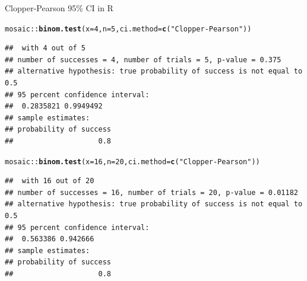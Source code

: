 \documentclass[10pt,handout]{beamer}\usepackage[]{graphicx}\usepackage[]{color}
\makeatletter
\newcommand{\hlnum}[1]{\textcolor[rgb]{0.686,0.059,0.569}{#1}}%
\newcommand{\hlstr}[1]{\textcolor[rgb]{0.192,0.494,0.8}{#1}}%
\newcommand{\hlopt}[1]{\textcolor[rgb]{0,0,0}{#1}}%
\newcommand{\hlstd}[1]{\textcolor[rgb]{0.345,0.345,0.345}{#1}}%
\newcommand{\hlkwc}[1]{\textcolor[rgb]{0.333,0.667,0.333}{#1}}%
\newcommand{\hlkwd}[1]{\textcolor[rgb]{0.737,0.353,0.396}{\textbf{#1}}}%
\newenvironment{kframe}{%
 \def\at@end@of@kframe{}%
 \ifinner\ifhmode%
  \def\at@end@of@kframe{\end{minipage}}%
  \begin{minipage}{\columnwidth}%
 \fi\fi%
 \def\FrameCommand##1{\hskip\@totalleftmargin \hskip-\fboxsep
 \colorbox{shadecolor}{##1}\hskip-\fboxsep
     \hskip-\linewidth \hskip-\@totalleftmargin \hskip\columnwidth}%
 \MakeFramed {\advance\hsize-\width
   \@totalleftmargin\z@ \linewidth\hsize
   \@setminipage}}%
 {\par\unskip\endMakeFramed%
 \at@end@of@kframe}
\newenvironment{knitrout}{}{} %
\makeatother
\begin{document}
\begin{frame}[fragile]{Clopper-Pearson 95\% CI in R}
\begin{knitrout}\tiny
{}\color{fgcolor}\begin{kframe}
\begin{alltt}
\hlstd{mosaic}\hlopt{::}\hlkwd{binom.test}\hlstd{(}\hlkwc{x}\hlstd{=}\hlnum{4}\hlstd{,} \hlkwc{n}\hlstd{=}\hlnum{5}\hlstd{,} \hlkwc{ci.method}\hlstd{=}\hlkwd{c}\hlstd{(}\hlstr{"Clopper-Pearson"}\hlstd{))}
\end{alltt}
\begin{verbatim}
##  with 4 out of 5 
## number of successes = 4, number of trials = 5, p-value = 0.375
## alternative hypothesis: true probability of success is not equal to 0.5 
## 95 percent confidence interval:
##  0.2835821 0.9949492 
## sample estimates:
## probability of success 
##                    0.8
\end{verbatim}
\begin{alltt}
\hlstd{mosaic}\hlopt{::}\hlkwd{binom.test}\hlstd{(}\hlkwc{x}\hlstd{=}\hlnum{16}\hlstd{,} \hlkwc{n}\hlstd{=}\hlnum{20}\hlstd{,} \hlkwc{ci.method}\hlstd{=}\hlkwd{c}\hlstd{(}\hlstr{"Clopper-Pearson"}\hlstd{))}
\end{alltt}
\begin{verbatim}
##  with 16 out of 20 
## number of successes = 16, number of trials = 20, p-value = 0.01182
## alternative hypothesis: true probability of success is not equal to 0.5 
## 95 percent confidence interval:
##  0.563386 0.942666 
## sample estimates:
## probability of success 
##                    0.8
\end{verbatim}
\end{kframe}
\end{knitrout}
\end{frame}
\end{document}
